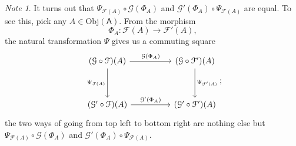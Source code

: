 \documentclass[a4paper,10pt]{scrreprt}
\newcommand{\Obj}{\mathrm{Obj}}
\theoremstyle{definition}
\theoremstyle{plain}
\theoremstyle{remark}
\newtheorem{note}{Note}[section]
\begin{document}
\begin{note}
  It turns out that $\Psi_{\mathcal{F}(A)} \circ \mathcal{G}(\Phi_{A})$ and $\mathcal{G}'(\Phi_{A}) \circ \Psi_{\mathcal{F}(A)}$ are equal. To see this, pick any $A \in \Obj(\mathsf{A})$. From the morphism
  \begin{equation*}
    \Phi_{A}\colon \mathcal{F}(A) \to \mathcal{F}'(A),
  \end{equation*}
  the natural transformation $\Psi$ gives us a commuting square
  \begin{equation*}
    \begin{tikzcd}[row sep=huge, column sep=huge]
      (\mathcal{G} \circ \mathcal{F})(A)
      \arrow[r, "\mathcal{G}(\Phi_{A})"]
      \arrow[d, swap, "\Psi_{\mathcal{F}(A)}"]
      & (\mathcal{G} \circ \mathcal{F}')(A)
      \arrow[d, "\Psi_{\mathcal{F}'(A)}"]
      \\
      (\mathcal{G}' \circ \mathcal{F})(A)
      \arrow[r, "\mathcal{G}'(\Phi_{A})"]
      & (\mathcal{G}' \circ \mathcal{F}')(A)
    \end{tikzcd};
  \end{equation*}
  the two ways of going from top left to bottom right are nothing else but $\Psi_{\mathcal{F}(A)} \circ \mathcal{G}(\Phi_{A})$ and $\mathcal{G}'(\Phi_{A}) \circ \Psi_{\mathcal{F}(A)}$.
\end{note}
\end{document}
